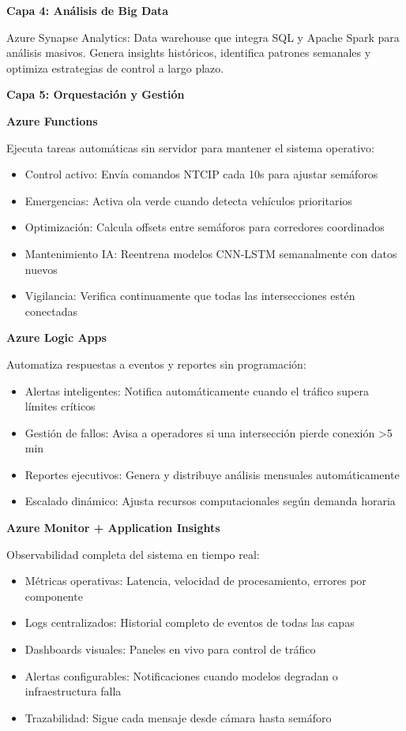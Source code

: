 \documentclass[12pt,a4paper,oneside]{report}
\begin{document}
\textbf{Capa 4: Análisis de Big Data}

Azure Synapse Analytics: Data warehouse que integra SQL y Apache Spark para análisis masivos. Genera insights históricos, identifica patrones semanales y optimiza estrategias de control a largo plazo.

\textbf{Capa 5: Orquestación y Gestión}

\textbf{Azure Functions}

Ejecuta tareas automáticas sin servidor para mantener el sistema operativo:

\begin{itemize}
\item
  Control activo: Envía comandos NTCIP cada 10s para ajustar semáforos
\item
  Emergencias: Activa ola verde cuando detecta vehículos prioritarios
\item
  Optimización: Calcula offsets entre semáforos para corredores coordinados
\item
  Mantenimiento IA: Reentrena modelos CNN-LSTM semanalmente con datos nuevos
\item
  Vigilancia: Verifica continuamente que todas las intersecciones estén conectadas
\end{itemize}

\textbf{Azure Logic Apps}

Automatiza respuestas a eventos y reportes sin programación:

\begin{itemize}
\item
  Alertas inteligentes: Notifica automáticamente cuando el tráfico supera límites críticos
\item
  Gestión de fallos: Avisa a operadores si una intersección pierde conexión \textgreater5 min
\item
  Reportes ejecutivos: Genera y distribuye análisis mensuales automáticamente
\item
  Escalado dinámico: Ajusta recursos computacionales según demanda horaria
\end{itemize}

\textbf{Azure Monitor + Application Insights}

Observabilidad completa del sistema en tiempo real:

\begin{itemize}
\item
  Métricas operativas: Latencia, velocidad de procesamiento, errores por componente
\item
  Logs centralizados: Historial completo de eventos de todas las capas
\item
  Dashboards visuales: Paneles en vivo para control de tráfico
\item
  Alertas configurables: Notificaciones cuando modelos degradan o infraestructura falla
\item
  Trazabilidad: Sigue cada mensaje desde cámara hasta semáforo
\end{itemize}
\end{document}
